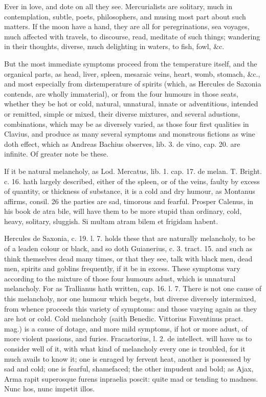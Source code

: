 {Ever in love, and dote on all they see. Mercurialists are solitary,
much in contemplation, subtle, poets, philosophers, and musing most
part about such matters. If the moon have a hand, they are all for
peregrinations, sea voyages, much affected with travels, to discourse,
read, meditate of such things; wandering in their thoughts, diverse,
much delighting in waters, to fish, fowl, \&c.

But the most immediate symptoms proceed from the temperature itself,
and the organical parts, as head, liver, spleen, mesaraic veins, heart,
womb, stomach, \&c., and most especially from distemperature of spirits
(which, as Hercules de Saxonia contends, are wholly immaterial),
or from the four humours in those seats, whether they be hot or cold,
natural, unnatural, innate or adventitious, intended or remitted,
simple or mixed, their diverse mixtures, and several adustions,
combinations, which may be as diversely varied, as those four
first qualities in  Clavius, and produce as many several symptoms
and monstrous fictions as wine doth effect, which as Andreas Bachius
observes, lib. 3. de vino, cap. 20. are infinite. Of greater note be
these.

If it be natural melancholy, as Lod. Mercatus, lib. 1. cap. 17. de
melan. T. Bright. c. 16. hath largely described, either of the spleen,
or of the veins, faulty by excess of quantity, or thickness of
substance, it is a cold and dry humour, as Montanus affirms, consil. 26
the parties are sad, timorous and fearful. Prosper Calenus, in his book
de atra bile, will have them to be more stupid than ordinary, cold,
heavy, solitary, sluggish. Si multam atram bilem et frigidam habent.

Hercules de Saxonia, c. 19. l. 7. holds these that are naturally
melancholy, to be of a leaden colour or black, and so doth Guianerius,
c. 3. tract. 15. and such as think themselves dead many times, or that
they see, talk with black men, dead men, spirits and goblins
frequently, if it be in excess. These symptoms vary according to the
mixture of those four humours adust, which is unnatural melancholy. For
as Trallianus hath written, cap. 16. l. 7. There is not one cause
of this melancholy, nor one humour which begets, but diverse diversely
intermixed, from whence proceeds this variety of symptoms: and those
varying again as they are hot or cold. Cold melancholy (saith
Benedic. Vittorius Faventinus pract. mag.) is a cause of dotage, and
more mild symptoms, if hot or more adust, of more violent passions, and
furies. Fracastorius, l. 2. de intellect. will have us to consider well
of it, with what kind of melancholy every one is troubled, for it
much avails to know it; one is enraged by fervent heat, another is
possessed by sad and cold; one is fearful, shamefaced; the other
impudent and bold; as Ajax, Arma rapit superosque furens inpraelia
poscit: quite mad or tending to madness. Nunc hos, nunc impetit illos.

}
